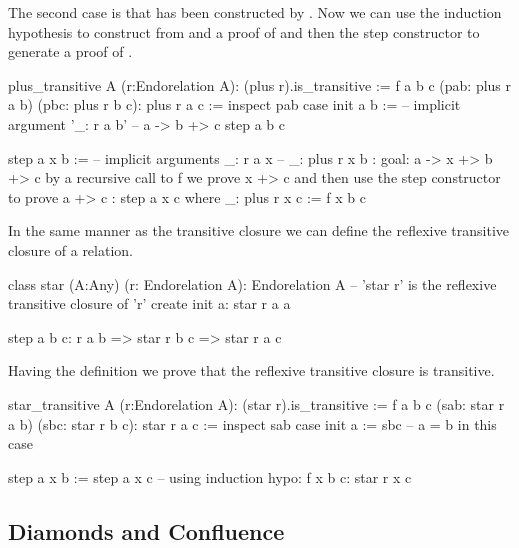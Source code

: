 The second case is that   has been constructed by . Now we can use the induction
hypothesis to construct from  and  a proof of  and then the step constructor to generate a proof of .


\begin{alba}
  plus_transitive A (r:Endorelation A): (plus r).is_transitive :=
    f a b c (pab: plus r a b) (pbc: plus r b c): plus r a c :=
      inspect
        pab
      case
        init a b :=   -- implicit argument '_: r a b'
            -- a -> b +> c
          step a b c

        step a x b :=
            -- implicit arguments _:  r a x
            --                    _: plus r x b
            {: goal: a -> x +> b +> c
               by a recursive call to f we prove x +> c
               and then use the step constructor to prove a +> c :}
          step a x c
          where
             _: plus r x c := f x b c
\end{alba}



In the same manner as the transitive closure we can define the reflexive
transitive closure of a relation.

\begin{alba}
  class
    star (A:Any) (r: Endorelation A): Endorelation A
      -- 'star r' is the reflexive transitive closure of 'r'
  create
    init a:
      star r a a

    step a b c:
      r a b
      => star r b c
      => star r a c
\end{alba}

Having the definition we prove that the reflexive transitive closure is
transitive.

\begin{alba}
  star_transitive A (r:Endorelation A): (star r).is_transitive :=
    f a b c (sab: star r a b) (sbc: star r b c): star r a c :=
      inspect
        sab
      case
        init a :=
          sbc
            -- a = b in this case

        step a x b :=
          step a x c
            -- using induction hypo: f x b c: star r x c
\end{alba}


\subsection{Diamonds and Confluence}


